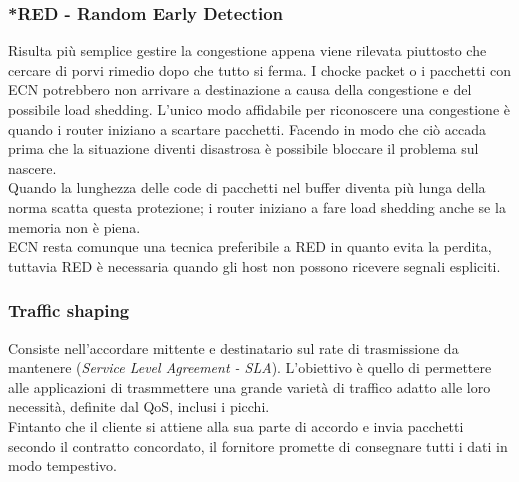 \documentclass[10pt,a4paper,twoside]{article}
\begin{document}
\subsubsection{*RED - Random Early Detection}
Risulta più semplice gestire la congestione appena viene rilevata piuttosto che cercare di porvi rimedio dopo che tutto si ferma. I chocke packet o i pacchetti con ECN potrebbero non arrivare a destinazione a causa della congestione e del possibile load shedding. L'unico modo affidabile per riconoscere una congestione è quando i router iniziano a scartare pacchetti. Facendo in modo che ciò accada prima che la situazione diventi disastrosa è possibile bloccare il problema sul nascere.\\
Quando la lunghezza delle code di pacchetti nel buffer diventa più lunga della norma scatta questa protezione; i router iniziano a fare load shedding anche se la memoria non è piena.\\
ECN resta comunque una tecnica preferibile a RED in quanto evita la perdita, tuttavia RED è necessaria quando gli host non possono ricevere segnali espliciti.

\subsubsection{Traffic shaping}
Consiste nell'accordare mittente e destinatario sul rate di trasmissione da mantenere (\textit{Service Level Agreement - SLA}).
L'obiettivo è quello di permettere alle applicazioni di trasmmettere una grande varietà di traffico adatto alle loro necessità, definite dal QoS, inclusi i picchi.\\
Fintanto che il cliente si attiene alla sua parte di accordo e invia pacchetti secondo il contratto concordato, il fornitore promette di consegnare tutti i dati in modo tempestivo.
\end{document}
